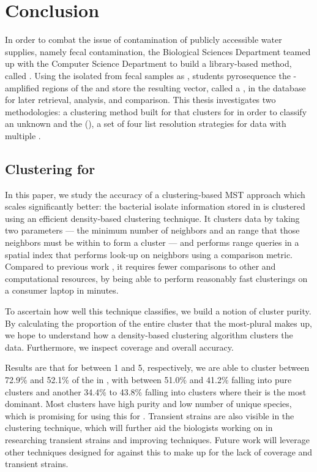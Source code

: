 \chapter{Conclusion}\label{chap:conclusion}
In order to combat the issue of contamination of publicly accessible water supplies, namely fecal contamination, the \cp{} Biological Sciences Department teamed up with the \cp{} Computer Science Department to build a library-based \mst{} method, called \cplop{}.
Using the \ecoli{} isolated from fecal samples as \fiblong{}, \cp{} students pyrosequence the \pcr{}-amplified \itslong{} regions of the \ecoli{} and store the resulting vector, called a \pyro{}, in the \cplop{} database for later retrieval, analysis, and comparison.
This thesis investigates two \mst{} methodologies: a \dbased{} clustering method built for \cplop{} that clusters for \bslongs{} in order to classify an unknown \isol{} and the \kraplong{} (\krap{}), a set of four \knnlong{} list resolution strategies for data with multiple \compfuncs{}.

\section{Clustering for \BSlongs{}}

In this paper, we study the accuracy of a clustering-based MST approach which scales significantly better: the bacterial isolate information stored in \cplop{} is clustered using an efficient density-based clustering technique.
It clusters data by taking two parameters --- the minimum number of neighbors and an \eps{} range that those neighbors must be within to form a cluster --- and performs range queries in a spatial index that performs  look-up on neighbors using a comparison metric.
Compared to previous work \cite{DBLP:conf/bibm/McGovernDKBVG15, montana2013ontological}, it requires fewer comparisons to other \isols{} and computational resources, by being able to perform reasonably fast clusterings on a consumer laptop in minutes.

To ascertain how well this technique classifies, we build a notion of cluster purity.
By calculating the proportion of the entire cluster that the most-plural \spec{} makes up, we hope to understand how a density-based clustering algorithm clusters the \cplop{} data.
Furthermore, we inspect coverage and overall accuracy.

Results are that for \minneigh{} between 1 and 5, respectively, we are able to cluster between 72.9\% and 52.1\% of the \isols{} in \cplop{}, with between 51.0\% and 41.2\% falling into pure clusters and another 34.4\% to 43.8\% falling into clusters where their \spec{} is the most dominant. 
Most clusters have high purity and low number of unique species, which is promising for using this for \mst{}.
Transient strains are also visible in the clustering technique, which will further aid the biologists working on \cplop{} in researching transient strains and improving \mst{} techniques. 
Future work will leverage other \mst{} techniques designed for \cplop{} against this to make up for the lack of coverage and transient strains.
